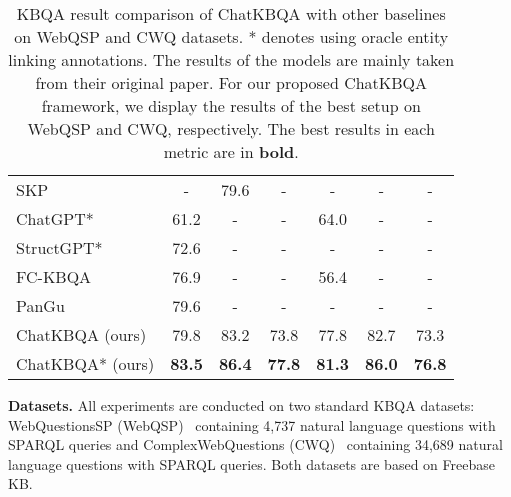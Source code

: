 \documentclass{article} \usepackage{iclr2024_conference,times}
\begin{document}
\begin{wraptable}{r}{0.5\textwidth}
{\begin{tabular}{lcccccc}
SKP                              & -             & 79.6                                         & \multicolumn{1}{c|}{-}             & -             & -                                            & -             \\
ChatGPT*                         & 61.2          & -                                            & \multicolumn{1}{c|}{-}             & 64.0          & -                                            & -             \\
StructGPT*                       & 72.6          & -                                            & \multicolumn{1}{c|}{-}             & -             & -                                            & -             \\
FC-KBQA                          & 76.9          & -                                            & \multicolumn{1}{c|}{-}             & 56.4          & -                                            & -             \\
PanGu                            & 79.6          & -                                            & \multicolumn{1}{c|}{-}             & -             & -                                            & -             \\ \hline\hline
ChatKBQA (ours)                        & 79.8          & 83.2                                         & \multicolumn{1}{c|}{73.8}          & 77.8          & 82.7                                         & 73.3          \\
ChatKBQA* (ours)                      & \textbf{83.5} & \textbf{86.4}                                & \multicolumn{1}{c|}{\textbf{77.8}} & \textbf{81.3} & \textbf{86.0}                                & \textbf{76.8} \\ \bottomrule
\end{tabular}}
\caption{\label{t4}
KBQA result comparison of ChatKBQA with other baselines on WebQSP and CWQ datasets. * denotes using oracle entity linking annotations. The results of the models are mainly taken from their original paper. For our proposed ChatKBQA framework, we display the results of the best setup on WebQSP and CWQ, respectively. The best results in each metric are in \textbf{bold}. 
}
\vspace{-15mm}
\end{wraptable}


\textbf{Datasets. } All experiments are conducted on two standard KBQA datasets: WebQuestionsSP (WebQSP)~\citep{WebQSP} containing 4,737 natural language questions with SPARQL queries and ComplexWebQuestions (CWQ)~\citep{CWQ} containing 34,689 natural language questions with SPARQL queries. Both datasets are based on Freebase~\citep{Freebase} KB. 
\end{document}
